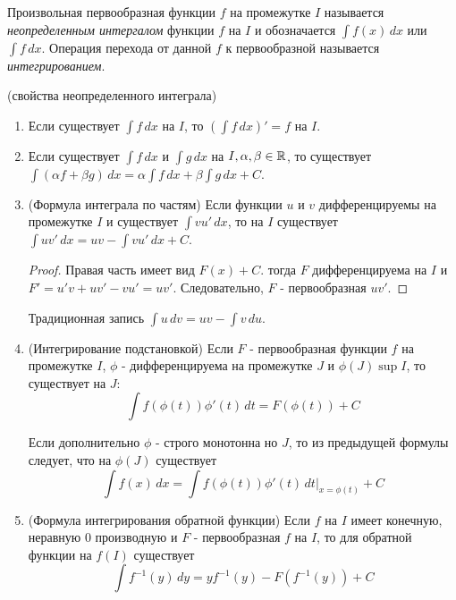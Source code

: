 \begin{definition}
    Произвольная первообразная функции $f$ на промежутке $I$ называется
    \textit{неопределенным интергалом} функции $f$ на $I$ и обозначается \(\int f(x) \,dx\) или \(\int f \,dx \).
    Операция перехода от данной $f$ к первообразной называется \textit{интегрированием}.
\end{definition}

\begin{note} (свойства неопределенного интеграла)
    \begin{enumerate}
        \item Если существует \(\int f \,dx \) на $I$, то \((\int f \,dx)' = f\) на $I$.
        \item Если существует \(\int f \,dx \) и \(\int g \,dx \) на $I, \alpha, \beta \in \mathbb{R}$, то
            существует \(\int (\alpha f + \beta g) \,dx = \alpha \int f \,dx + \beta \int g \,dx + C\).
        \item (Формула интеграла по частям) Если функции $u$ и $v$ дифференцируемы на промежутке $I$
            и существует \(\int vu' \,dx\), то на $I$ существует \(\int uv' \,dx = uv - \int vu' \,dx + C\).
            \begin{proof}
                Правая часть имеет вид $F(x) + C$. тогда $F$ дифференцируема на $I$ и $F' = u'v + uv' - vu' = uv'$.
                Следовательно, $F$ - первообразная $uv'$.
            \end{proof}
            
            \begin{corollary}
                Традиционная запись \(\int u \,dv = uv - \int v \,du\).
            \end{corollary}
        \item (Интегрирование подстановкой) Если $F$ - первообразная функции $f$ на промежутке $I$,
            $\phi$ - дифференцируема на промежутке $J$ и $\phi(J) \sup I$, то существует на $J$:
            \[\int f(\phi(t))\phi'(t) \,dt = F(\phi(t)) + C\]
            \begin{corollary}
                Если дополнительно $\phi$ - строго монотонна но $J$, то из предыдущей формулы следует,
                что на $\phi(J)$ существует 
                \[\int f(x) \,dx = \int f(\phi(t)) \phi'(t) \,dt|_{x = \phi(t)} + C\]
            \end{corollary}
        \item (Формула интегрирования обратной функции) Если $f$ на $I$ имеет конечную, неравную
            0 производную и $F$ - первообразная $f$ на $I$, то для обратной функции на $f(I)$ существует
            \[\int f^{-1}(y) \,dy = yf^{-1}(y) - F(f^{-1}(y)) + C\]
    \end{enumerate}
\end{note}


